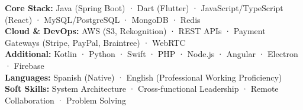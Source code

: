 
\begin{cvparagraph}
\textbf{Core Stack:} Java (Spring Boot) · Dart (Flutter) · JavaScript/TypeScript (React) · MySQL/PostgreSQL · MongoDB · Redis
\\
\textbf{Cloud \& DevOps:} AWS (S3, Rekognition) · REST APIs · Payment Gateways (Stripe, PayPal, Braintree) · WebRTC
\\
\textbf{Additional:} Kotlin · Python · Swift · PHP · Node.js · Angular · Electron · Firebase
\\
\textbf{Languages:} Spanish (Native) · English (Professional Working Proficiency)
\\
\textbf{Soft Skills:} System Architecture · Cross-functional Leadership · Remote Collaboration · Problem Solving
\end{cvparagraph}
